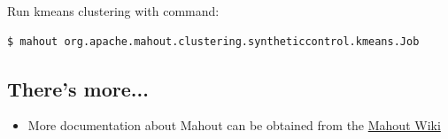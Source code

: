 Run kmeans clustering with command:
\lstset{style=bashstyle}
\begin{lstlisting}$ mahout org.apache.mahout.clustering.syntheticcontrol.kmeans.Job
\end{lstlisting}

\subsection*{There's more...}
\begin{itemize}
  \item More documentation about Mahout can be obtained from the \href{https://cwiki.apache.org/confluence/display/MAHOUT/Mahout+Wiki}{Mahout Wiki}
\end{itemize}
